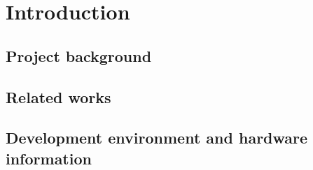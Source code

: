 
\chapter{Introduction}
\label{chap:intro}


\section{Project background}




\section{Related works}




\section{Development environment and hardware information}
